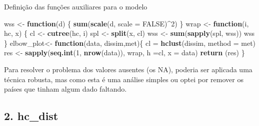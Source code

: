 \documentclass[]{article}
\newenvironment{Shaded}{\begin{snugshade}}{\end{snugshade}}
\newcommand{\ControlFlowTok}[1]{\textcolor[rgb]{0.13,0.29,0.53}{\textbf{#1}}}
\newcommand{\DataTypeTok}[1]{\textcolor[rgb]{0.13,0.29,0.53}{#1}}
\newcommand{\DecValTok}[1]{\textcolor[rgb]{0.00,0.00,0.81}{#1}}
\newcommand{\KeywordTok}[1]{\textcolor[rgb]{0.13,0.29,0.53}{\textbf{#1}}}
\newcommand{\NormalTok}[1]{#1}
\newcommand{\OperatorTok}[1]{\textcolor[rgb]{0.81,0.36,0.00}{\textbf{#1}}}
\newcommand{\OtherTok}[1]{\textcolor[rgb]{0.56,0.35,0.01}{#1}}
\newcommand{\StringTok}[1]{\textcolor[rgb]{0.31,0.60,0.02}{#1}}
\begin{document}
Definição das funções auxiliares para o modelo

\begin{Shaded}
\begin{Highlighting}[]
\NormalTok{wss <-}\StringTok{ }\ControlFlowTok{function}\NormalTok{(d) \{}
  \KeywordTok{sum}\NormalTok{(}\KeywordTok{scale}\NormalTok{(d, }\DataTypeTok{scale =} \OtherTok{FALSE}\NormalTok{)}\OperatorTok{^}\DecValTok{2}\NormalTok{)}
\NormalTok{\}}
\NormalTok{wrap <-}\StringTok{ }\ControlFlowTok{function}\NormalTok{(i, hc, x) \{}
\NormalTok{  cl <-}\StringTok{ }\KeywordTok{cutree}\NormalTok{(hc, i)}
\NormalTok{  spl <-}\StringTok{ }\KeywordTok{split}\NormalTok{(x, cl)}
\NormalTok{  wss <-}\StringTok{ }\KeywordTok{sum}\NormalTok{(}\KeywordTok{sapply}\NormalTok{(spl, wss))}
\NormalTok{  wss}
\NormalTok{\}}
\NormalTok{elbow_plot<-}\StringTok{ }\ControlFlowTok{function}\NormalTok{(data, dissim,met)\{}
\NormalTok{  cl =}\StringTok{ }\KeywordTok{hclust}\NormalTok{(dissim, }\DataTypeTok{method =}\NormalTok{ met)  }
\NormalTok{  res <-}\StringTok{ }\KeywordTok{sapply}\NormalTok{(}\KeywordTok{seq.int}\NormalTok{(}\DecValTok{1}\NormalTok{, }\KeywordTok{nrow}\NormalTok{(data)), }
\NormalTok{                  wrap, }\DataTypeTok{h =}\NormalTok{cl, }
                  \DataTypeTok{x =}\NormalTok{ data)}
  \KeywordTok{return}\NormalTok{ (res)}
\NormalTok{\}}
\end{Highlighting}
\end{Shaded}

Para resolver o problema dos valores ausentes (os NA), poderia ser
aplicada uma técnica robusta, mas como esta é uma análise simples ou
optei por remover os países que tinham algum dado faltando.

\begin{Shaded}
\end{Shaded}

\hypertarget{hc_dist}{%
\subsection{2. hc\_dist}\label{hc_dist}}
\end{document}
